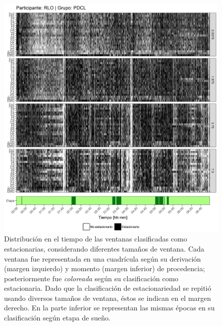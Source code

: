 \begin{figure}
\centering
\includegraphics[width=\linewidth]
{./scripts_graf_res/RLO_patrones_1.png}
\caption[Distribución en el tiempo de las ventanas clasificadas como estacionarias, considerando diferentes tamaños de ventana]{Distribución en el tiempo de las ventanas clasificadas como estacionarias, considerando diferentes tamaños de ventana. 
Cada ventana fue representada en una cuadrícula según su derivación (margen izquierdo) y momento (margen inferior) de procedencia; posteriormente fue \textit{coloreada} según su clasificación como estacionaria.
Dado que la clasificación de estacionariedad se repitió usando diversos tamaños de ventana, éstos se indican en el margen derecho.
En la parte inferior se representan las mismas épocas en su clasificación según etapa de sueño.}
\end{figure}
